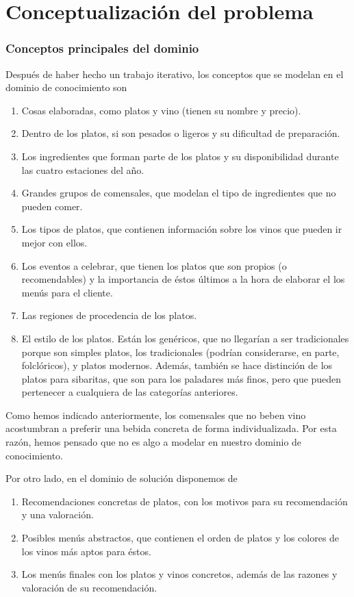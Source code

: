 % 

\section{Conceptualización del problema}
\subsubsection{Conceptos principales del dominio}
Después de haber hecho un trabajo iterativo, los conceptos que se modelan en el
dominio de conocimiento son
\begin{enumerate}
  \item Cosas elaboradas, como platos y vino (tienen su nombre y precio).
  \item Dentro de los platos, si son pesados o ligeros y su dificultad de
    preparación.
  \item Los ingredientes que forman parte de los platos y su disponibilidad
    durante las cuatro estaciones del año.
  \item Grandes grupos de comensales, que modelan el tipo de ingredientes que
    no pueden comer.
  \item Los tipos de platos, que contienen información sobre los vinos que
    pueden ir mejor con ellos.
  \item Los eventos a celebrar, que tienen los platos que son propios (o
    recomendables) y la importancia de éstos últimos a la hora de elaborar el
    los menús para el cliente.
  \item Las regiones de procedencia de los platos.
  \item El estilo de los platos. Están los genéricos, que no llegarían a ser
    tradicionales porque son simples platos, los tradicionales (podrían
    considerarse, en parte, folclóricos), y platos modernos. Además, también se
    hace distinción de los platos para sibaritas, que son para los paladares
    más finos, pero que pueden pertenecer a cualquiera de las categorías
    anteriores.
\end{enumerate}

Como hemos indicado anteriormente, los comensales que no beben vino acostumbran
a preferir una bebida concreta de forma individualizada. Por esta razón, hemos
pensado que no es algo a modelar en nuestro dominio de conocimiento.

Por otro lado, en el dominio de solución disponemos de
\begin{enumerate}
  \item Recomendaciones concretas de platos, con los motivos para su
    recomendación y una valoración.
  \item Posibles menús abstractos, que contienen el orden de platos y los
    colores de los vinos más aptos para éstos.
  \item Los menús finales con los platos y vinos concretos, además de las
    razones y valoración de su recomendación.
\end{enumerate}

